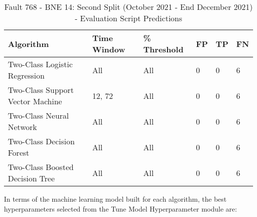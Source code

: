 \begin{table}[!ht]
    \centering
    \begin{tabular}{|l|l|l|l|l|l|}
    \hline
        Algorithm & Time Window & \% Threshold & FP & TP & FN \\ \hline
        Two-Class Logistic Regression & All & All & 0 & 0 & 6 \\ \hline
        Two-Class Support Vector Machine & 12, 72 & All & 0 & 0 & 6 \\ \hline
        Two-Class Neural Network & All & All & 0 & 0 & 6 \\ \hline
        Two-Class Decision Forest & All & All & 0 & 0 & 6 \\ \hline
        Two-Class Boosted Decision Tree & All & All & 0 & 0 & 6 \\ \hline
    \end{tabular}
    \caption{Fault 768 - BNE 14: Second Split (October 2021 - End December 2021) - Evaluation Script Predictions}
    \label{9112_SCA34_1st}
\end{table}

In terms of the machine learning model built for each algorithm, the best hyperparameters selected from the Tune Model Hyperparameter module are:

